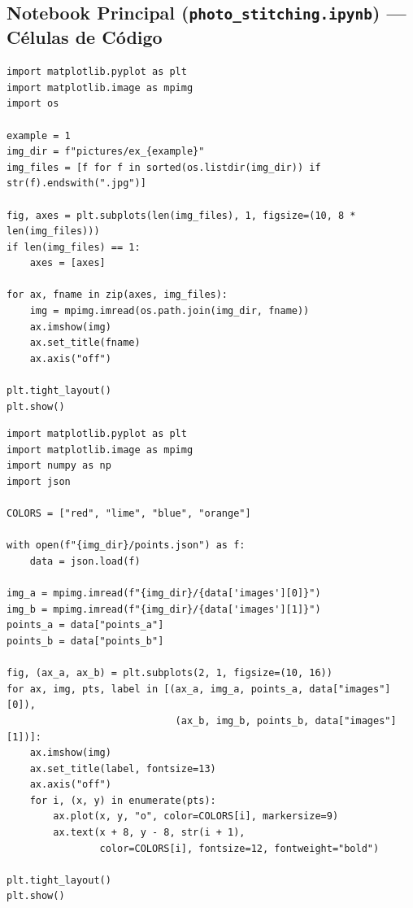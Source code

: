 \documentclass[12pt,a4paper]{article}
\begin{document}
\subsection{Notebook Principal (\texttt{photo\_stitching.ipynb}) --- Células de Código}

\begin{lstlisting}[caption={Carregamento e visualização das imagens de entrada.}]
import matplotlib.pyplot as plt
import matplotlib.image as mpimg
import os

example = 1
img_dir = f"pictures/ex_{example}"
img_files = [f for f in sorted(os.listdir(img_dir)) if str(f).endswith(".jpg")]

fig, axes = plt.subplots(len(img_files), 1, figsize=(10, 8 * len(img_files)))
if len(img_files) == 1:
    axes = [axes]

for ax, fname in zip(axes, img_files):
    img = mpimg.imread(os.path.join(img_dir, fname))
    ax.imshow(img)
    ax.set_title(fname)
    ax.axis("off")

plt.tight_layout()
plt.show()
\end{lstlisting}

\begin{lstlisting}[caption={Carregamento dos pontos correspondentes e visualização.}]
import matplotlib.pyplot as plt
import matplotlib.image as mpimg
import numpy as np
import json

COLORS = ["red", "lime", "blue", "orange"]

with open(f"{img_dir}/points.json") as f:
    data = json.load(f)

img_a = mpimg.imread(f"{img_dir}/{data['images'][0]}")
img_b = mpimg.imread(f"{img_dir}/{data['images'][1]}")
points_a = data["points_a"]
points_b = data["points_b"]

fig, (ax_a, ax_b) = plt.subplots(2, 1, figsize=(10, 16))
for ax, img, pts, label in [(ax_a, img_a, points_a, data["images"][0]),
                             (ax_b, img_b, points_b, data["images"][1])]:
    ax.imshow(img)
    ax.set_title(label, fontsize=13)
    ax.axis("off")
    for i, (x, y) in enumerate(pts):
        ax.plot(x, y, "o", color=COLORS[i], markersize=9)
        ax.text(x + 8, y - 8, str(i + 1),
                color=COLORS[i], fontsize=12, fontweight="bold")

plt.tight_layout()
plt.show()
\end{lstlisting}
\end{document}
